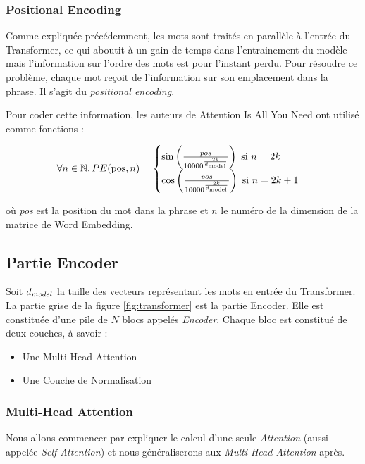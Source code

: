 \subsubsection{Positional Encoding}

Comme expliquée précédemment, les mots sont traités en parallèle à l'entrée du Transformer, ce qui aboutit à un gain de
temps dans l'entrainement du modèle mais l'information sur l'ordre des mots est pour l'instant perdu. Pour résoudre
ce problème, chaque mot reçoit de l'information sur son emplacement dans la phrase. Il s'agit du \textit{positional encoding}.

Pour coder cette information, les auteurs de \og Attention Is All You Need \fg{} \cite{vaswani2017attention} ont utilisé comme fonctions :

\[ \forall n \in \mathbb{N}, PE(\text{pos}, n) =
\begin{cases}
  \sin\left( \frac{pos}{10 000^{ \frac{2k}{d_\text{model}}}} \right) \text{ si } n = 2k\\
  \cos\left( \frac{pos}{10 000^{ \frac{2k}{d_\text{model}}}} \right) \text{ si } n = 2k+1 \\
\end{cases} \]

\noindent{}où \textit{pos} est la position du mot dans la phrase et $n$ le numéro de la dimension de la matrice de Word Embedding.

\subsection{Partie Encoder}

Soit $d_{model}$ la taille des vecteurs représentant les mots en entrée du Transformer. La partie grise de la figure \ref{fig:transformer} est la partie Encoder. Elle est constituée d'une pile de $N$ blocs appelés \textit{Encoder}.
Chaque bloc est constitué de deux couches, à savoir :
\begin{itemize}
\item Une Multi-Head Attention
\item Une Couche de Normalisation
\end{itemize}

\subsubsection{Multi-Head Attention}

Nous allons commencer par expliquer le calcul d'une seule \textit{Attention} (aussi appelée \textit{Self-Attention}) et nous généraliserons aux \textit{Multi-Head Attention} après. \\

